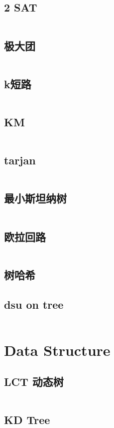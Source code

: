 \documentclass[titlepage, a4paper]{article}
\begin{document}
\begin{multicols}{2}
\begin{spacing}{0.6}
				\subsection{2 SAT}
					\inputminted{cpp}{src/Graph/2-SAT.cpp}
				\subsection{极大团}
					\inputminted{cpp}{src/Graph/极大团.cpp}
				\subsection{k短路}
					\inputminted{cpp}{src/Graph/k短路.cpp}
				\subsection{KM}
					\inputminted{cpp}{src/Graph/KM.cpp}
				\subsection{tarjan}
					\inputminted{cpp}{src/Graph/tarjan.cpp}
				\subsection{最小斯坦纳树}
					\inputminted{cpp}{src/Graph/最小斯坦纳树.cpp}
				\subsection{欧拉回路}
					\inputminted{cpp}{src/Graph/欧拉回路.cpp}
				\subsection{树哈希}	
					
				\subsection{dsu on tree}
					\inputminted{cpp}{src/Graph/dsu_on_tree.cpp}
			\section{Data Structure}
				\subsection{LCT 动态树}
					\inputminted{cpp}{src/DataStructure/LCT.cpp}
				\subsection{KD Tree}
					\inputminted{cpp}{src/DataStructure/KDT1.cpp}
					\inputminted{cpp}{src/DataStructure/KDT2.cpp}

\end{spacing}
\end{multicols}
\end{document}
